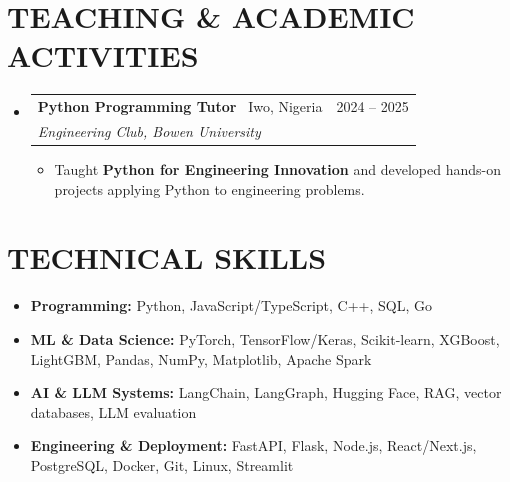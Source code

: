 \documentclass[11pt,a4paper]{article}
\makeatletter
\newcommand{\resumeSubheading}[5]{
  \vspace{2pt}
  \item[]
    \begin{tabular*}{\textwidth}[t]{l@{\extracolsep{\fill}}r}
      \textbf{#1} \textnormal{ \textbar\ #4} & #2 \\ %
      \textit{#3} & \\ %
    \end{tabular*}
    #5
  \vspace{-8pt}
}
\makeatother
\begin{document}
\vspace{-12pt}

\section{TEACHING \& ACADEMIC ACTIVITIES}

\begin{itemize}[leftmargin=0pt, label={}]

\resumeSubheading
  {Python Programming Tutor}{2024 -- 2025}
  {Engineering Club, Bowen University}{Iwo, Nigeria}
  {
  \begin{itemize}[leftmargin=15pt, label=\textbullet]
    \item Taught \textbf{Python for Engineering Innovation} and developed hands-on projects applying Python to engineering problems.
  \end{itemize}
  }

\end{itemize}

\section{TECHNICAL SKILLS}

\begin{itemize}[leftmargin=0pt, label={}]
\item \textbf{Programming:} Python, JavaScript/TypeScript, C++, SQL, Go

\item \textbf{ML \& Data Science:} PyTorch, TensorFlow/Keras, Scikit-learn, XGBoost, LightGBM, Pandas, NumPy, Matplotlib, Apache Spark

\item \textbf{AI \& LLM Systems:} LangChain, LangGraph, Hugging Face, RAG, vector databases, LLM evaluation

\item \textbf{Engineering \& Deployment:} FastAPI, Flask, Node.js, React/Next.js, PostgreSQL, Docker, Git, Linux, Streamlit

\end{itemize}
\end{document}
